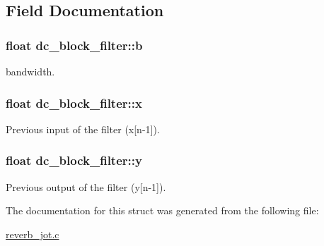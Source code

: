 \subsection{Field Documentation}
\hypertarget{structdc__block__filter_a368d9cdea5bf60962e415f9958d0c296}{
\subsubsection[{b}]{\setlength{\rightskip}{0pt plus 5cm}float dc\-\_\-block\-\_\-filter\-::b}}\label{structdc__block__filter_a368d9cdea5bf60962e415f9958d0c296}
bandwidth. \hypertarget{structdc__block__filter_a51740a56346e009262b43b57937412af}{
\subsubsection[{x}]{\setlength{\rightskip}{0pt plus 5cm}float dc\-\_\-block\-\_\-filter\-::x}}\label{structdc__block__filter_a51740a56346e009262b43b57937412af}
Previous input of the filter (x\mbox{[}n-\/1\mbox{]}). \hypertarget{structdc__block__filter_ac47f2dcae35a1948fb7280f8b9fb34cd}{
\subsubsection[{y}]{\setlength{\rightskip}{0pt plus 5cm}float dc\-\_\-block\-\_\-filter\-::y}}\label{structdc__block__filter_ac47f2dcae35a1948fb7280f8b9fb34cd}
Previous output of the filter (y\mbox{[}n-\/1\mbox{]}). 

The documentation for this struct was generated from the following file\-:\begin{DoxyCompactItemize}
\item 
\hyperlink{reverb__jot_8c}{reverb\-\_\-jot.\-c}\end{DoxyCompactItemize}
